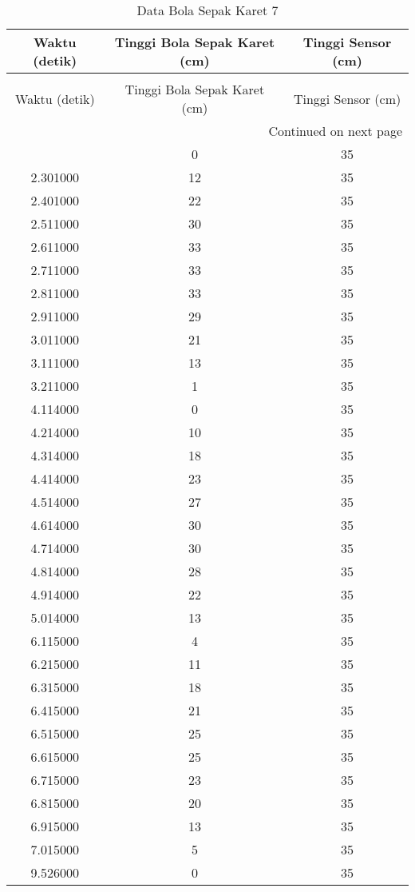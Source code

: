 \begin{longtable}[htbp]{|c|c|c|}
\caption{Data Bola Sepak Karet 7} \\
\hline
Waktu (detik) & Tinggi Bola Sepak Karet (cm) & Tinggi Sensor (cm) \\ \hline
\endfirsthead
\caption[]{Data Bola Sepak Karet 7} \\
\hline
Waktu (detik) & Tinggi Bola Sepak Karet (cm) & Tinggi Sensor (cm) \\ \hline
\endhead
\multicolumn{3}{r}{Continued on next page} \\
\endfoot
\endlastfoot
2.201000 & 0 & 35 \\ \hline
2.301000 & 12 & 35 \\ \hline
2.401000 & 22 & 35 \\ \hline
2.511000 & 30 & 35 \\ \hline
2.611000 & 33 & 35 \\ \hline
2.711000 & 33 & 35 \\ \hline
2.811000 & 33 & 35 \\ \hline
2.911000 & 29 & 35 \\ \hline
3.011000 & 21 & 35 \\ \hline
3.111000 & 13 & 35 \\ \hline
3.211000 & 1 & 35 \\ \hline
4.114000 & 0 & 35 \\ \hline
4.214000 & 10 & 35 \\ \hline
4.314000 & 18 & 35 \\ \hline
4.414000 & 23 & 35 \\ \hline
4.514000 & 27 & 35 \\ \hline
4.614000 & 30 & 35 \\ \hline
4.714000 & 30 & 35 \\ \hline
4.814000 & 28 & 35 \\ \hline
4.914000 & 22 & 35 \\ \hline
5.014000 & 13 & 35 \\ \hline
6.115000 & 4 & 35 \\ \hline
6.215000 & 11 & 35 \\ \hline
6.315000 & 18 & 35 \\ \hline
6.415000 & 21 & 35 \\ \hline
6.515000 & 25 & 35 \\ \hline
6.615000 & 25 & 35 \\ \hline
6.715000 & 23 & 35 \\ \hline
6.815000 & 20 & 35 \\ \hline
6.915000 & 13 & 35 \\ \hline
7.015000 & 5 & 35 \\ \hline
9.526000 & 0 & 35 \\ \hline
\end{longtable}
